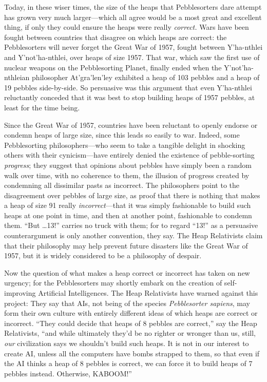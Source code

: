 {
 Today, in these wiser times, the size of the heaps that
Pebblesorters dare attempt has grown very much larger---which all agree
would be a most great and excellent thing, if only they could ensure
the heaps were really \textit{correct.} Wars have been fought between
countries that disagree on which heaps are correct: the Pebblesorters
will never forget the Great War of 1957, fought between
Y'ha-nthlei and
Y'not'ha-nthlei, over heaps of size
1957. That war, which saw the first use of nuclear weapons on the
Pebblesorting Planet, finally ended when the
Y'not'ha-nthleian philosopher
At'gra'len'ley
exhibited a heap of 103 pebbles and a heap of 19 pebbles side-by-side.
So persuasive was this argument that even Y'ha-nthlei
reluctantly conceded that it was best to stop building heaps of 1957
pebbles, at least for the time being.}

{
 Since the Great War of 1957, countries have been reluctant to
openly endorse or condemn heaps of large size, since this leads so
easily to war. Indeed, some Pebblesorting philosophers---who seem to
take a tangible delight in shocking others with their cynicism---have
entirely denied the existence of pebble-sorting \textit{progress}; they
suggest that opinions about pebbles have simply been a random walk over
time, with no coherence to them, the illusion of progress created by
condemning all dissimilar pasts as incorrect. The philosophers point to
the disagreement over pebbles of large size, as proof that there is
nothing that makes a heap of size 91 really \textit{incorrect}{}---that
it was simply fashionable to build such heaps at one point in time, and
then at another point, fashionable to condemn them.
``But \ldots 13!'' carries no truck
with them; for to regard ``13!'' as
a persuasive counterargument is only another convention, they say. The
Heap Relativists claim that their philosophy may help prevent future
disasters like the Great War of 1957, but it is widely considered to be
a philosophy of despair.}

{
 Now the question of what makes a heap correct or incorrect has
taken on new urgency; for the Pebblesorters may shortly embark on the
creation of self-improving Artificial Intelligences. The Heap
Relativists have warned against this project: They say that AIs, not
being of the species \textit{Pebblesorter sapiens}, may form their own
culture with entirely different ideas of which heaps are correct or
incorrect. ``They could decide that heaps of 8 pebbles
are correct,'' say the Heap Relativists,
``and while ultimately they'd be no
righter or wronger than us, still, \textit{our} civilization says we
shouldn't build such heaps. It is not in our interest
to create AI, unless all the computers have bombs strapped to them, so
that even if the AI thinks a heap of 8 pebbles is correct, we can force
it to build heaps of 7 pebbles instead. Otherwise,
KABOOM!''}


